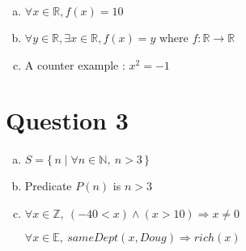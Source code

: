 \documentclass[12pt]{article}
\begin{document}
\begin{enumerate}[a)]
    \item
        $\forall x \in \mathbb{R}, f(x) = 10$

    \item
        $\forall y \in \mathbb{R}, \exists x \in \mathbb{R}, f(x) = y$ where $f: \mathbb{R} \to \mathbb{R}$

    \item
        A counter example : $x^2 = -1$

\end{enumerate}

\section*{Question 3}

\begin{enumerate}[a)]
    \item
        $S = \{\,n \mid \forall n \in \mathbb{N},\:n > 3\,\}$
    \item
        Predicate $P(n)$ is $n > 3$
    \item
        $\forall x \in \mathbb{Z},\:(-40 < x) \land (x > 10) \Rightarrow x \ne 0$

        $\forall x \in \mathbb{E},\:sameDept(x, Doug) \Rightarrow rich(x)$

\end{enumerate}
\end{document}
